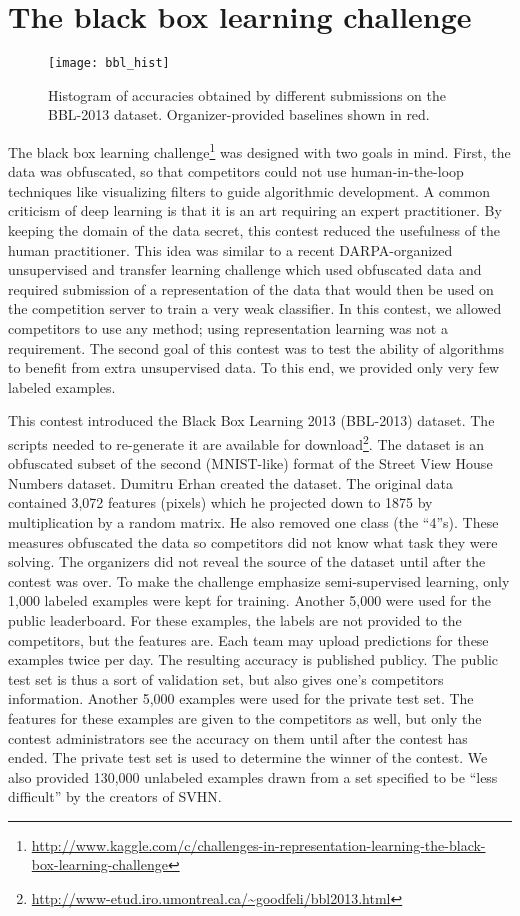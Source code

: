 \documentclass{llncs}
\begin{document}
\section{The black box learning challenge}
\begin{wrapfigure}{l}{0.5\textwidth}\texttt{[image: bbl\_hist]}
\caption{\small{Histogram of accuracies obtained by different submissions on the BBL-2013 dataset.
Organizer-provided baselines shown in red.}
\label{bbl_hist}}
\end{wrapfigure}

The black box learning challenge\footnote{\tiny{\url{http://www.kaggle.com/c/challenges-in-representation-learning-the-black-box-learning-challenge}}}
was designed with two goals in mind. First, the data was obfuscated, so that competitors could not use human-in-the-loop techniques like
visualizing filters to guide algorithmic development. A common criticism of deep learning is that it is an art requiring an expert practitioner.
By keeping the domain of the data secret, this contest reduced the usefulness of the human practitioner. 
This idea was similar to a recent DARPA-organized unsupervised and transfer learning challenge \citep{Guyon-UTLC-ijcnn2011} which used
obfuscated data and required submission of a representation of the data that would then be used on the competition server to train a very weak
classifier. In this contest, we allowed competitors to use any method; using representation learning was not a requirement.
The second goal of this contest was to test the ability of algorithms to benefit from extra unsupervised data. To this end, we provided only
very few labeled examples.


This contest introduced the Black Box Learning 2013 (BBL-2013) dataset.
The scripts needed to re-generate it are available for download\footnote{\tiny{\url{http://www-etud.iro.umontreal.ca/~goodfeli/bbl2013.html}}}.
The dataset is an obfuscated subset of the second (MNIST-like) format of the Street View House Numbers dataset\citep{Netzer-wkshp-2011}.
Dumitru Erhan created the dataset. The original data contained 3,072 features (pixels) which he projected down to 1875 by multiplication
by a random matrix. He also removed one class (the ``4''s). These measures obfuscated the data so competitors did not know what task they
were solving. The organizers did not reveal the source of the dataset until after the contest was over. To make the challenge emphasize
semi-supervised learning, only 1,000 labeled examples were kept for training. Another 5,000 were used for the public leaderboard. For these
examples, the labels are not provided to the competitors, but the features are. Each team may upload predictions for these examples twice
per day. The resulting accuracy is published publicy. The public test set is thus a sort of validation set, but also gives one's competitors
information. Another 5,000 examples were used for the private test set. The features for these examples are given to the competitors as well,
but only the contest administrators see the accuracy on them until after the contest has ended. The private test set is used to determine
the winner of the contest. We also provided 130,000 unlabeled examples drawn from a set specified to be ``less difficult'' by the creators of
SVHN. 
\end{document}

